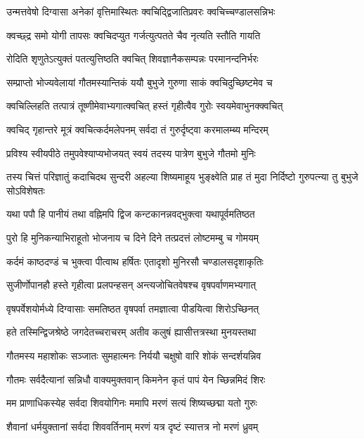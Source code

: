 \twolineshloka
{उन्मत्तवेषो दिग्वासा अनेकां वृत्तिमास्थितः}
{क्वचिद्द्विजातिप्रवरः क्वचिच्चण्डालसन्निभः}%

\twolineshloka
{क्वच्छ्द्र समो योगी तापसः क्वचिदप्युत}
{गर्जत्युत्पतते चैव नृत्यति स्तौति गायति}%

\twolineshloka
{रोदिति शृणुतेऽत्युक्तं पतत्युत्तिष्ठति क्वचित्}
{शिवज्ञानैकसम्पन्नः परमानन्दनिर्भरः}%

\twolineshloka
{सम्प्राप्तो भोज्यवेलायां गौतमस्यान्तिकं ययौ}
{बुभुजे गुरुणा साकं क्वचिदुच्छिष्टमेव च}%

\twolineshloka
{क्वचिल्लिहति तत्पात्रं तूष्णीमेवाभ्यगात्क्वचित्}
{हस्तं गृहीत्वैव गुरोः स्वयमेवाभुनक्क्वचित्}%

\twolineshloka
{क्वचिद् गृहान्तरे मूत्रं क्वचित्कर्दमलेपनम्}
{सर्वदा तं गुरुर्दृष्ट्वा करमालम्ब्य मन्दिरम्}%

\twolineshloka
{प्रविश्य स्वीयपीठे तमुपवेश्याप्यभोजयत्}
{स्वयं तदस्य पात्रेण बुभुजे गौतमो मुनिः}%

\threelineshloka
{तस्य चित्तं परिज्ञातुं कदाचिदथ सुन्दरी}
{अहल्या शिष्यमाहूय भुङ्क्ष्वेति प्राह तं मुदा}
{निर्दिष्टो गुरुपत्न्या तु बुभुजे सोऽविशेषतः}%

\twolineshloka
{यथा पपौ हि पानीयं तथा वह्निमपि द्विज}
{कन्टकानन्नवद्भुक्त्वा यथापूर्वमतिष्ठत}%

\twolineshloka
{पुरो हि मुनिकन्याभिराहूतो भोजनाय च}
{दिने दिने तत्प्रदत्तं लोष्टमम्बु च गोमयम्}%

\twolineshloka
{कर्दमं काष्ठदण्डं च भुक्त्वा पीत्वाथ हर्षितः}
{एतादृशो मुनिरसौ चण्डालसदृशाकृतिः}%

\twolineshloka
{सुजीर्णोपानहौ हस्ते गृहीत्वा प्रलपन्हसन्}
{अन्त्यजोचितवेषश्च वृषपर्वाणमभ्यगात्}%

\twolineshloka
{वृषपर्वेशयोर्मध्ये दिग्वासाः समतिष्ठत}
{वृषपर्वा तमज्ञात्वा पीडयित्वा शिरोऽच्छिनत्}%

\twolineshloka
{हते तस्मिन्द्विजश्रेष्ठे जगदेतच्चराचरम्}
{अतीव कलुषं ह्यासीत्तत्रस्था मुनयस्तथा}%

\twolineshloka
{गौतमस्य महाशोकः सञ्जातः सुमहात्मनः}
{निर्ययौ चक्षुषो वारि शोकं सन्दर्शयन्निव}%

\twolineshloka
{गौतमः सर्वदैत्यानां सन्निधौ वाक्यमुक्तवान्}
{किमनेन कृतं पापं येन च्छिन्नमिदं शिरः}%

\twolineshloka
{मम प्राणाधिकस्येह सर्वदा शिवयोगिनः}
{ममापि मरणं सत्यं शिष्यच्छद्मा यतो गुरुः}%

\twolineshloka
{शैवानां धर्मयुक्तानां सर्वदा शिववर्तिनाम्}
{मरणं यत्र दृष्टं स्यात्तत्र नो मरणं ध्रुवम्}%

